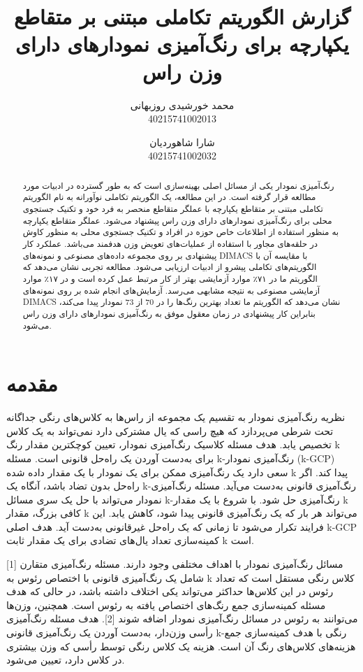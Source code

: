 \documentclass[a4paper,10pt]{article}
\title{گزارش الگوریتم تکاملی مبتنی بر متقاطع یکپارچه برای رنگ‌آمیزی نمودارهای دارای وزن راس}
\author{محمد خورشیدی روزبهانی\\40215741002013 \and شارا شاهوردیان\\40215741002032}
\date{}
\begin{document}
    \maketitle
    
    \vspace{0.5cm}

    \begin{abstract}

        رنگ‌آمیزی نمودار یکی از مسائل اصلی بهینه‌سازی است که به طور گسترده در ادبیات مورد مطالعه قرار گرفته است. در این مطالعه، یک الگوریتم تکاملی نوآورانه به نام الگوریتم تکاملی مبتنی بر متقاطع یکپارچه با عملگر متقاطع منحصر به فرد خود و تکنیک جستجوی محلی برای رنگ‌آمیزی نمودارهای دارای وزن راس پیشنهاد می‌شود. عملگر متقاطع یکپارچه به منظور استفاده از اطلاعات خاص حوزه در افراد و تکنیک جستجوی محلی به منظور کاوش در حلقه‌های مجاور با استفاده از عملیات‌های تعویض وزن هدفمند می‌باشد. عملکرد کار پیشنهادی بر روی مجموعه داده‌های مصنوعی و نمونه‌های DIMACS با مقایسه آن با الگوریتم‌های تکاملی پیشرو از ادبیات ارزیابی می‌شود. مطالعه تجربی نشان می‌دهد که الگوریتم ما در ۷۱٪ موارد آزمایشی بهتر از کار مرتبط عمل کرده است و در ۱۷٪ موارد آزمایشی مصنوعی به نتیجه مشابهی می‌رسد. آزمایش‌های انجام شده بر روی نمونه‌های DIMACS نشان می‌دهد که الگوریتم ما تعداد بهترین رنگ‌ها را در 70 از 73 نمودار پیدا می‌کند، بنابراین کار پیشنهادی در زمان معقول موفق به رنگ‌آمیزی نمودارهای دارای وزن راس می‌شود.
    
    \end{abstract}

    \section{مقدمه}

        نظریه رنگ‌آمیزی نمودار به تقسیم یک مجموعه از راس‌ها به کلاس‌های رنگی جداگانه تحت شرطی می‌پردازد که هیچ راسی که یال مشترکی دارد نمی‌تواند به یک کلاس تخصیص یابد. هدف مسئله کلاسیک رنگ‌آمیزی نمودار، تعیین کوچکترین مقدار رنگ k برای به‌دست آوردن یک راه‌حل قانونی است. مسئله k-رنگ‌آمیزی نمودار (k-GCP) سعی دارد یک رنگ‌آمیزی ممکن برای یک نمودار با یک مقدار داده شده k پیدا کند. اگر راه‌حل بدون تضاد باشد، آنگاه یک k-رنگ‌آمیزی قانونی به‌دست می‌آید. مسئله رنگ‌آمیزی نمودار می‌تواند با حل یک سری مسائل k-رنگ‌آمیزی حل شود. با شروع با یک مقدار k کافی بزرگ، مقدار k می‌تواند هر بار که یک رنگ‌آمیزی قانونی پیدا شود، کاهش یابد. این فرایند تکرار می‌شود تا زمانی که یک راه‌حل غیرقانونی به‌دست آید. هدف اصلی k-GCP کمینه‌سازی تعداد یال‌های تضادی برای یک مقدار ثابت k است.

        مسائل رنگ‌آمیزی نمودار با اهداف مختلفی وجود دارند. مسئله رنگ‌آمیزی متقارن [1] شامل یک رنگ‌آمیزی قانونی با اختصاص رئوس به k کلاس رنگی مستقل است که تعداد رئوس در این کلاس‌ها حداکثر می‌تواند یکی اختلاف داشته باشد، در حالی که هدف مسئله کمینه‌سازی جمع رنگ‌های اختصاص یافته به رئوس است. همچنین، وزن‌ها می‌توانند به رئوس در مسائل رنگ‌آمیزی نمودار اضافه شوند [2]. هدف مسئله رنگ‌آمیزی رأسی وزن‌دار، به‌دست آوردن یک رنگ‌آمیزی قانونی k-رنگی با هدف کمینه‌سازی جمع هزینه‌های کلاس‌های رنگ آن است. هزینه یک کلاس رنگی توسط رأسی که وزن بیشتری در کلاس دارد، تعیین می‌شود.
\end{document}
